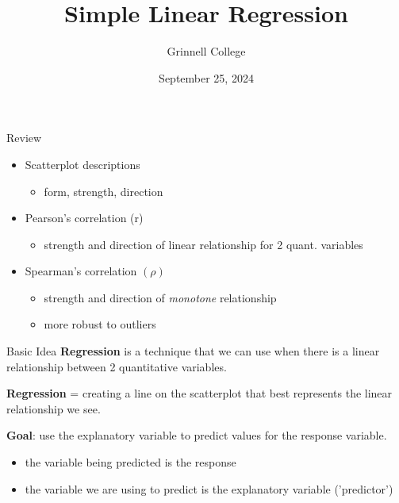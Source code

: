 \documentclass{beamer}
\title[SST-115 / STA-209]{Simple Linear Regression}
\subtitle{}
\author{Grinnell College}
\date{September 25, 2024}
\begin{document}
\begin{frame}
  \titlepage
\end{frame}

\begin{frame}{Review}
\begin{itemize}
    \item Scatterplot descriptions
        \begin{itemize}
            \item form, strength, direction
        \end{itemize} \vspace{3mm}
    \item Pearson's correlation (r)
        \begin{itemize}
            \item strength and direction of linear relationship for 2 quant. variables
        \end{itemize}\vspace{3mm}
    \item Spearman's correlation $(\rho)$
        \begin{itemize}
            \item strength and direction of \textit{monotone} relationship
            \item more robust to outliers
        \end{itemize}
\end{itemize}
\end{frame}



\begin{frame}{Basic Idea}
\textbf{Regression} is a technique that we can use when there is a linear relationship between 2 quantitative variables. \vspace{4mm}

\textbf{Regression} = creating a line on the scatterplot that best represents the linear relationship we see. \vspace{4mm}

\textbf{Goal}: use the explanatory variable to predict values for the response variable.
\begin{itemize}
    \item the variable being predicted is the response
    \item the variable we are using to predict is the explanatory variable ('predictor')
\end{itemize}
\end{frame}
\end{document}
